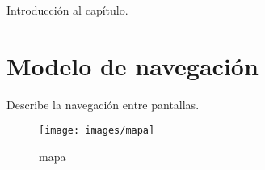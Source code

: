 Introducción al capítulo.

\section{Modelo de navegación}

Describe la navegación entre pantallas.

\begin{figure}[htbp]
	\begin{center}
		\texttt{[image: images/mapa]}
		\caption{mapa}
		\label{fig:mapa}
	\end{center}
\end{figure}
